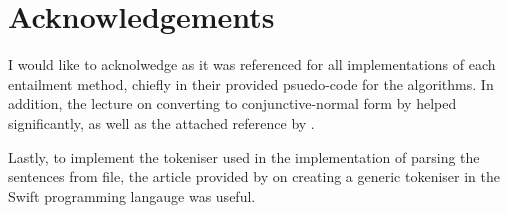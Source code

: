 \section*{Acknowledgements}
\label{sec:Acknowledgements}

I would like to acknolwedge \citet{aima2009} as it was referenced for all
implementations of each entailment method, chiefly in their provided
psuedo-code for the algorithms. In addition, the lecture on converting to
conjunctive-normal form by \citet{meyden2000} helped significantly, as well as
the attached reference by \citet{huth2004}.

Lastly, to implement the tokeniser used in the implementation of parsing the
sentences from file, the article provided by \citet{swiftstudies} on creating
a generic tokeniser in the Swift programming langauge was useful.
